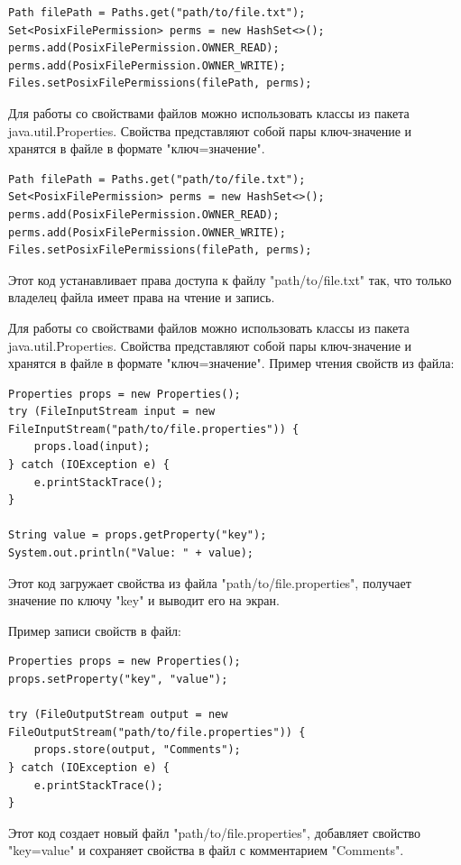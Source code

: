 \begin{lstlisting}
Path filePath = Paths.get("path/to/file.txt");
Set<PosixFilePermission> perms = new HashSet<>();
perms.add(PosixFilePermission.OWNER_READ);
perms.add(PosixFilePermission.OWNER_WRITE);
Files.setPosixFilePermissions(filePath, perms);
\end{lstlisting}

Для работы со свойствами файлов можно использовать классы из пакета java.util.Properties. Свойства представляют собой пары ключ-значение и хранятся в файле в формате "ключ=значение".

\begin{lstlisting}
Path filePath = Paths.get("path/to/file.txt");
Set<PosixFilePermission> perms = new HashSet<>();
perms.add(PosixFilePermission.OWNER_READ);
perms.add(PosixFilePermission.OWNER_WRITE);
Files.setPosixFilePermissions(filePath, perms);
\end{lstlisting}

Этот код устанавливает права доступа к файлу "path/to/file.txt" так, что только владелец файла имеет права на чтение и запись.

Для работы со свойствами файлов можно использовать классы из пакета java.util.Properties. Свойства представляют собой пары ключ-значение и хранятся в файле в формате "ключ=значение". Пример чтения свойств из файла:

\begin{lstlisting}
Properties props = new Properties();
try (FileInputStream input = new FileInputStream("path/to/file.properties")) {
    props.load(input);
} catch (IOException e) {
    e.printStackTrace();
}

String value = props.getProperty("key");
System.out.println("Value: " + value);
\end{lstlisting}

Этот код загружает свойства из файла "path/to/file.properties", получает значение по ключу "key" и выводит его на экран.

Пример записи свойств в файл:

\begin{lstlisting}
Properties props = new Properties();
props.setProperty("key", "value");

try (FileOutputStream output = new FileOutputStream("path/to/file.properties")) {
    props.store(output, "Comments");
} catch (IOException e) {
    e.printStackTrace();
}
\end{lstlisting}

Этот код создает новый файл "path/to/file.properties", добавляет свойство "key=value" и сохраняет свойства в файл с комментарием \newline "Comments".


